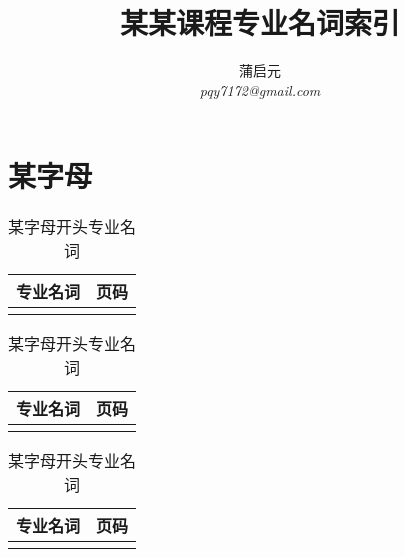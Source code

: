 \documentclass{wx672article}
\title{某某课程专业名词索引}
\author{蒲启元 \\
 \emph{pqy7172@gmail.com}}
\begin{document}
\maketitle{}

\section{某字母}
\label{sec:}
 \begin{table}[!ht] %
      \centering
        \begin{tabular}[t]{c|c} %
          \hline
          专业名词 &  页码   \\
          \hline
           &  \\
          \hline
        \end{tabular}
        \hfill
        \begin{tabular}[t]{c|c}
          \hline
          专业名词  &  页码  \\
          \hline
           &  \\
          \hline
        \end{tabular}
        \hfill
        \begin{tabular}[t]{c|c}
          \hline
          专业名词 &  页码 \\
          \hline
           &  \\
          \hline
        \end{tabular}
        \caption{某字母开头专业名词}\label{tab}
    \end{table}
\end{document}
